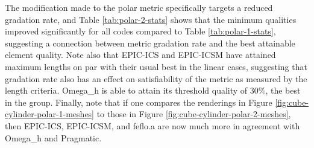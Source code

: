 \documentclass[3p,times,procedia,number]{elsarticle}
\begin{document}
The modification made to the polar metric specifically targets
a reduced gradation rate, and Table \ref{tab:polar-2-stats}
shows that the minimum qualities improved significantly for all
codes compared to Table \ref{tab:polar-1-stats}, suggesting a
connection between metric gradation rate and the best attainable
element quality.
Note also that EPIC-ICS and EPIC-ICSM have attained maximum lengths
on par with their usual best in the linear cases, suggesting that
gradation rate also has an effect on satisfiability of the metric
as measured by the length criteria.
Omega\_h is able to attain its threshold quality of 30\%, the best in the group.
Finally, note that if one compares the renderings
in Figure \ref{fig:cube-cylinder-polar-1-meshes} to those in
Figure \ref{fig:cube-cylinder-polar-2-meshes}, then EPIC-ICS,
EPIC-ICSM, and feflo.a are now much more in agreement with
Omega\_h and Pragmatic.
\end{document}
